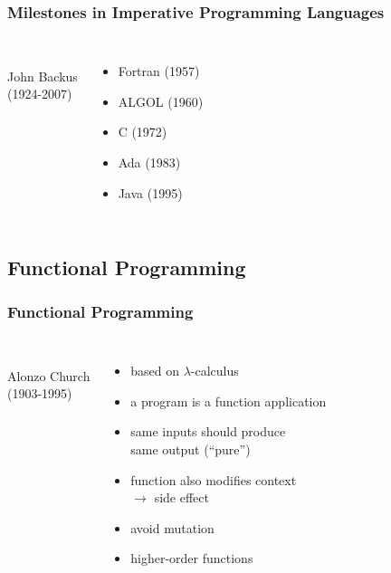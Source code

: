 \documentclass[dvipsnames]{beamer}
\theoremstyle{plain}
\begin{document}
\begin{frame}
  \frametitle{Milestones in Imperative Programming Languages}

  \begin{columns}
    \begin{center}
      \\
      John Backus\\
      (1924-2007)
    \end{center}

    \begin{itemize}
      \item Fortran (1957)
      \item ALGOL (1960)
      \item C (1972)
      \item Ada (1983)
      \item Java (1995)
    \end{itemize}
  \end{columns}
\end{frame}

\subsection{Functional Programming}

\begin{frame}
  \frametitle{Functional Programming}

  \begin{columns}
    \begin{center}
      \\
      Alonzo Church\\
      (1903-1995)
    \end{center}

    \begin{itemize}
      \item based on $\lambda$-calculus
      \item a program is a function application
      \item same inputs should produce\\
        same output (``pure'')
      \item function also modifies context\\
        $\rightarrow$ \alert{side effect}
      \item avoid mutation
      \item higher-order functions
    \end{itemize}
  \end{columns}
\end{frame}
\end{document}
